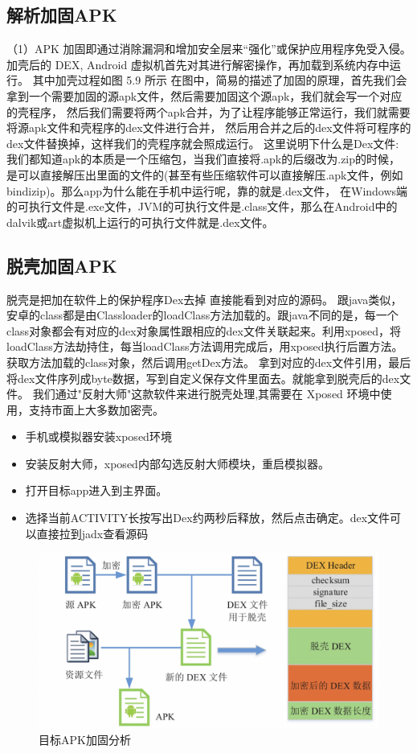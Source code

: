 \subsection{解析加固APK}
（1）APK 加固即通过消除漏洞和增加安全层来“强化”或保护应用程序免受入侵。加壳后的 DEX, Android 虚拟机首先对其进行解密操作，再加载到系统内存中运行。
其中加壳过程如图 5.9 所示
在图中，简易的描述了加固的原理，首先我们会拿到一个需要加固的源apk文件，然后需要加固这个源apk，我们就会写一个对应的壳程序，
然后我们需要将两个apk合并，为了让程序能够正常运行，我们就需要将源apk文件和壳程序的dex文件进行合并，
然后用合并之后的dex文件将可程序的dex文件替换掉，这样我们的壳程序就会照成运行。
这里说明下什么是Dex文件:
我们都知道apk的本质是一个压缩包，当我们直接将.apk的后缀改为.zip的时候，是可以直接解压出里面的文件的(甚至有些压缩软件可以直接解压.apk文件，例如bindizip)。那么app为什么能在手机中运行呢，靠的就是.dex文件，
在Windows端的可执行文件是.exe文件，JVM的可执行文件是.class文件，那么在Android中的dalvik或art虚拟机上运行的可执行文件就是.dex文件。
\subsection{脱壳加固APK}
脱壳是把加在软件上的保护程序Dex去掉 直接能看到对应的源码。
跟java类似，安卓的class都是由Classloader的loadClass方法加载的。跟java不同的是，每一个class对象都会有对应的dex对象属性跟相应的dex文件关联起来。利用xposed，将loadClass方法劫持住，每当loadClass方法调用完成后，用xposed执行后置方法。获取方法加载的class对象，然后调用getDex方法。
拿到对应的dex文件引用，最后将dex文件序列成byte数据，写到自定义保存文件里面去。就能拿到脱壳后的dex文件。
我们通过"反射大师"这款软件来进行脱壳处理,其需要在 Xposed 环境中使用，支持市面上大多数加密壳。
\begin{itemize}
  \item 手机或模拟器安装xposed环境
  \item 安装反射大师，xposed内部勾选反射大师模块，重启模拟器。
  \item 打开目标app进入到主界面。
  \item 选择当前ACTIVITY长按写出Dex约两秒后释放，然后点击确定。dex文件可以直接拉到jadx查看源码
\end{itemize}

\begin{figure}
  \centering
  \includegraphics[scale=0.5]{resources/img/i24.png}
  \caption{目标APK加固分析}
\end{figure}

